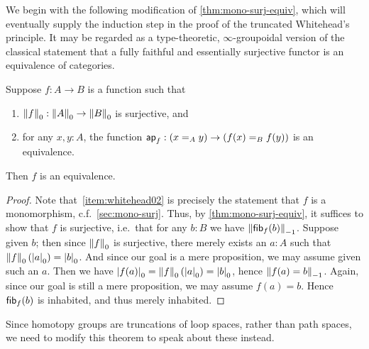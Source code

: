 We begin with the following modification of \autoref{thm:mono-surj-equiv}, which will eventually supply the induction step in the proof of the truncated Whitehead's principle.
It may be regarded as a type-theoretic, $\infty$-groupoidal version of the classical statement that a fully faithful and essentially surjective functor is an equivalence of categories.

\begin{thm}\label{thm:whitehead0}
  Suppose $f:A\to B$ is a function such that
  \begin{enumerate}
  \item $\trunc0 f : \trunc0 A \to \trunc0 B$ is surjective, and\label{item:whitehead01}
  \item for any $x,y:A$, the function $\apfunc f : (\id[A]xy) \to (\id[B]{f(x)}{f(y)})$ is an equivalence.\label{item:whitehead02}
  \end{enumerate}
  Then $f$ is an equivalence.
\end{thm}
\begin{proof}
  Note that~\ref{item:whitehead02} is precisely the statement that $f$ is a monomorphism, c.f.~\autoref{sec:mono-surj}.
  Thus, by \autoref{thm:mono-surj-equiv}, it suffices to show that $f$ is surjective, i.e.\ that for any $b:B$ we have $\trunc{-1}{\hfib f b}$.
  Suppose given $b$; then since $\trunc0 f$ is surjective, there merely exists an $a:A$ such that $\trunc 0 f(\tproj0a) = \tproj0b$.
  And since our goal is a mere proposition, we may assume given such an $a$.
  Then we have $\tproj0{f(a)} = \trunc 0 f(\tproj0a) =\tproj0b$, hence $\trunc{-1}{f(a)=b}$.
  Again, since our goal is still a mere proposition, we may assume $f(a)=b$.
  Hence $\hfib f b$ is inhabited, and thus merely inhabited.
\end{proof}

Since homotopy groups are truncations of loop spaces, rather than path spaces, we need to modify this theorem to speak about these instead.

